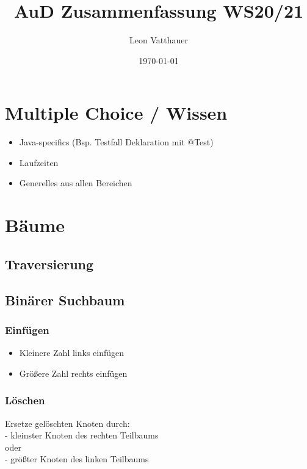 \documentclass{article}
\author{Leon Vatthauer}
\title{AuD Zusammenfassung WS20/21}
\date{\today}
\begin{document}
	\maketitle
	\tableofcontents
	\pagebreak
	\linespread{0.5}
	\section{Multiple Choice / Wissen}
	\begin{itemize}
		\item Java-specifics (Bsp. Testfall Deklaration mit @Test)
		\item Laufzeiten
		\item Generelles aus allen Bereichen
	\end{itemize}
	\section{Bäume}
	\subsection{Traversierung}
	\subsection{Binärer Suchbaum}
	\subsubsection*{Einfügen}
	\begin{itemize}
		\item Kleinere Zahl links einfügen
		\item Größere Zahl rechts einfügen
	\end{itemize}
	\subsubsection*{Löschen}
	Ersetze gelöschten Knoten durch:
	\\- kleinster Knoten des rechten Teilbaums
	\\oder
	\\- größter Knoten des linken Teilbaums
\end{document}

